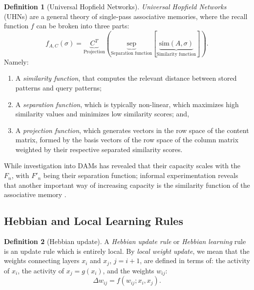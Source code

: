 \documentclass{article}
\theoremstyle{definition}
\newtheorem{definition}{Definition}[subsection]
\begin{document}
\begin{definition}[Universal Hopfield Networks]
  \textit{Universal Hopfield Networks} (UHNs) are a general theory
  of single-pass associative memories, where the recall function $f$
  can be broken into
  three parts:
  $$
  f_{A,C}(\sigma) = \underbrace{C^T}_{\text{Projection}} \left(
    \underbrace{\text{sep}}_{\text{Separation function}}
    \left[ \underbrace{\text{sim}(A, \sigma)}_{\text{Similarity
  function}} \right] \right).
  $$
  Namely:
  \begin{enumerate}[(1)]
    \item A \textit{similarity function}, that computes the relevant
      distance between stored
      patterns and query patterns;
    \item A \textit{separation function}, which is typically
      non-linear, which maximizes
      high similarity values and minimizes low similarity scores; and,
    \item A \textit{projection function}, which generates vectors in the row
      space of the content matrix, formed by the basis vectors of the
      row space of the
      column matrix weighted by their respective separated similarity scores.
  \end{enumerate}
\end{definition}

While investigation into DAMs has revealed that their capacity scales with
the $F_n$, with $F'_n$ being their separation function; informal experimentation
reveals that another important way of increasing capacity is the
similarity function
of the associative memory
\parencites{millidge_predictive_2022,hu_provably_2024}.

\subsection{Hebbian and Local Learning Rules}\label{sec:hebb}

\begin{definition}[Hebbian update]\label{def:hebb}
  A \textit{Hebbian update rule} or \textit{Hebbian learning} rule is an update
  rule which is entirely local. By \textit{local weight update}, we mean that
  the weights connecting layers $x_i$ and $x_j$, $j = i + 1$, are defined
  in terms of: the activity of $x_i$, the activity of $x_j = g(x_i)$, and
  the weights $w_{ij}$:
  \begin{equation}
    \Delta w_{ij} = f (w_{ij}; x_i, x_j).
  \end{equation}
\end{definition}
\end{document}
